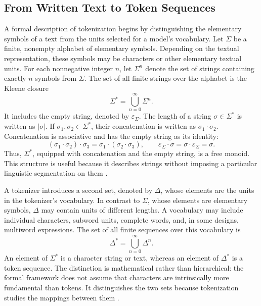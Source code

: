 \subsection{From Written Text to Token Sequences}
\label{subsec:tokenizer-text-representation}

A formal description of tokenization begins by distinguishing the elementary symbols of a text from the units selected for a model's vocabulary. Let \(\Sigma\) be a finite, nonempty alphabet of elementary symbols. Depending on the textual representation, these symbols may be characters or other elementary textual units. For each nonnegative integer \(n\), let \(\Sigma^n\) denote the set of strings containing exactly \(n\) symbols from \(\Sigma\). The set of all finite strings over the alphabet is the Kleene closure
\begin{equation}
    \Sigma^* = \bigcup_{n=0}^{\infty}\Sigma^n.
    \label{eq:tokenizer-kleene-closure}
\end{equation}
It includes the empty string, denoted by \(\varepsilon_\Sigma\). The length of a string \(\sigma\in\Sigma^*\) is written as \(|\sigma|\). If \(\sigma_1,\sigma_2\in\Sigma^*\), their concatenation is written as \(\sigma_1\cdot\sigma_2\). Concatenation is associative and has the empty string as its identity:
\begin{equation}
    (\sigma_1\cdot\sigma_2)\cdot\sigma_3
    =
    \sigma_1\cdot(\sigma_2\cdot\sigma_3),
    \qquad
    \varepsilon_\Sigma\cdot\sigma
    =
    \sigma\cdot\varepsilon_\Sigma
    =
    \sigma.
    \label{eq:tokenizer-character-concatenation}
\end{equation}
Thus, \(\Sigma^*\), equipped with concatenation and the empty string, is a free monoid. This structure is useful because it describes strings without imposing a particular linguistic segmentation on them \parencite{gastaldi2025foundations}.

A tokenizer introduces a second set, denoted by \(\Delta\), whose elements are the units in the tokenizer's vocabulary. In contrast to \(\Sigma\), whose elements are elementary symbols, \(\Delta\) may contain units of different lengths. A vocabulary may include individual characters, subword units, complete words, and, in some designs, multiword expressions. The set of all finite sequences over this vocabulary is
\begin{equation}
    \Delta^* = \bigcup_{n=0}^{\infty}\Delta^n.
    \label{eq:tokenizer-vocabulary-closure}
\end{equation}
An element of \(\Sigma^*\) is a character string or text, whereas an element of \(\Delta^*\) is a token sequence. The distinction is mathematical rather than hierarchical: the formal framework does not assume that characters are intrinsically more fundamental than tokens. It distinguishes the two sets because tokenization studies the mappings between them \parencite{gastaldi2025foundations}.

